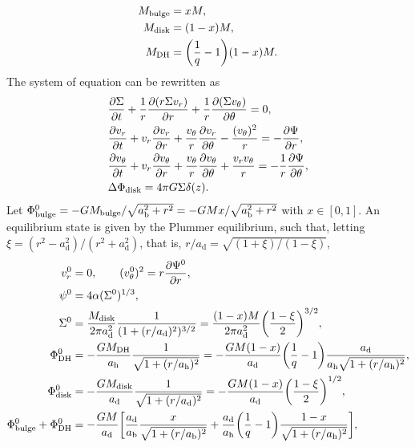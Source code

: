 \documentclass[11pt]{article}
\newcommand{\vr}{v_{r}}
\newcommand{\vt}{v_{\theta}}
\newcommand{\Sigmad}{\Sigma_{\rm{disk}}}
\newcommand{\Phib}{\Phi_{\rm{bulge}}}
\newcommand{\Phid}{\Phi_{\rm{disk}}}
\newcommand{\Phidh}{\Phi_{\rm{DH}}}
\newcommand{\Mb}{M_{\rm{bulge}}}
\newcommand{\Md}{M_{\rm{disk}}}
\newcommand{\Mdh}{M_{\rm{DH}}}
\newcommand{\Msg}{M_{\rm{sg}}}
\newcommand{\ad}{a_{\mathrm{d}}}
\newcommand{\ab}{a_{\mathrm{b}}}
\newcommand{\ah}{a_{\mathrm{h}}}
\begin{document}
\begin{align*}
\Mb &= x M,\\
\Md &= (1 - x)M  ,\\
\Mdh &= \bigg(\frac{1}{q}-1\bigg) (1-x) M.
\end{align*}
The system of equation can be rewritten as 
\begin{align}
&\frac{\partial \Sigma}{\partial t} + \frac{1}{r} \frac{\partial(r\Sigma \vr)}{\partial r} + \frac{1}{r} \frac{\partial(\Sigma \vt)}{\partial \theta} = 0 ,\\
&\frac{\partial \vr}{\partial t} + \vr \frac{\partial \vr}{\partial r} + \frac{\vt}{r} \frac{\partial \vr}{\partial \theta} - \frac{(\vt)^2}{r} = -\frac{\partial \Psi}{\partial r} ,\\
&\frac{\partial \vt}{\partial t} + \vr \frac{\partial \vt}{\partial r} + \frac{\vt}{r} \frac{\partial \vt}{\partial \theta} + \frac{\vr\vt}{r} = -\frac{1}{r}\frac{\partial \Psi}{\partial \theta} ,\\
& \Delta \Phid = 4\pi G \Sigma \delta (z).
\end{align}
 Let $\Phib^0 = - G \Mb/\sqrt{\ab^2+r^2}=- G  M x/\sqrt{\ab^2+r^2}$ with $x\in [0,1]$. An equilibrium state is given by the Plummer equilibrium, such that,  letting $\xi = (r^2-\ad^2)/(r^2+\ad^2) $, that is, $r/\ad=\sqrt{(1+\xi)/(1-\xi)}$,
\begin{align}
\vr^0 &= 0,\quad \quad (\vt^0)^2 = r \frac{\partial \Psi^0}{\partial r}, \\
 \psi^0 &= 4 \alpha  (\Sigma^0)^{1/3} ,\\
 \Sigma^0 &= \frac{\Md}{2\pi \ad^2} \frac{1}{(1+(r/\ad)^2)^{3/2}} =\frac{(1-x)M}{2\pi \ad^2}   \bigg(\frac{1-\xi}{2}\bigg)^{3/2},\\
  \Phidh^0 &= -\frac{G \Mdh}{\ah } \frac{1}{\sqrt{1+(r/\ah)^2}} = -\frac{G M(1-x)}{\ad }\bigg(\frac{1}{q}-1\bigg) \frac{\ad}{\ah\sqrt{1+(r/\ah)^2}} ,\\
 \Phid^0 &= -\frac{G \Md}{\ad } \frac{1}{\sqrt{1+(r/\ad)^2}} = -\frac{G M (1-x)}{\ad } \bigg(\frac{1-\xi}{2}\bigg)^{1/2} ,\\
  \Phib^0+\Phidh^0 &= -\frac{G M }{\ad  } \bigg[\frac{\ad}{\ab}\frac{x}{\sqrt{1+(r/\ab)^2}}+\frac{\ad}{\ah}\bigg(\frac{1}{q}-1\bigg)\frac{1-x}{\sqrt{1+(r/\ah)^2}}\bigg] ,\\
\end{align}
\end{document}
